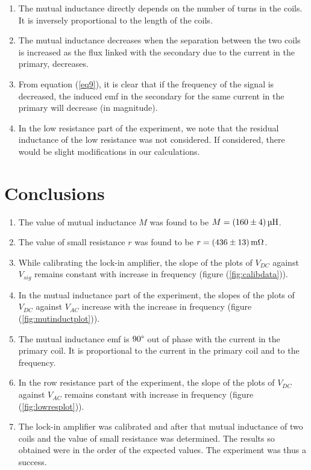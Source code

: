 \documentclass[%
 reprint,
nofootinbib,
 amsmath,amssymb,
 aps,
]{revtex4-2}
\begin{document}
\begin{enumerate}
    \item The mutual inductance directly depends on the number of turns in the coils. It is inversely proportional to the length of the coils.
    \item The mutual inductance decreases when the separation between the two coils is increased as the flux linked with the secondary due to the current in the primary, decreases.
    \item From equation (\ref{eq9}), it is clear that if the frequency of the signal is decreased, the induced emf in the secondary for the same current in the primary will decrease (in magnitude).
    \item In the low resistance part of the experiment, we note that the residual inductance of the low resistance was not considered. If considered, there would be slight modifications in our calculations.
\end{enumerate}

\section{Conclusions}
\begin{enumerate}
    \item The value of mutual inductance $M$ was found to be $M = \SI[separate-uncertainty=true]{160 \pm 4}{\micro \henry}$.
    \item The value of small resistance $r$ was found to be $r = \SI[separate-uncertainty=true]{436 \pm 13}{\milli \ohm}$.
    \item While calibrating the lock-in amplifier, the slope of the plots of $V_{DC}$ against $V_{sig}$ remains constant with increase in frequency (figure (\ref{fig:calibdata})).
    \item In the mutual inductance part of the experiment, the slopes of the plots of $V_{DC}$ against $V_{AC}$ increase with the increase in frequency (figure (\ref{fig:mutinductplot})).
    \item The mutual inductance emf is $90 \degree$ out of phase with the current in the primary coil. It is proportional to the current in the primary coil and to the frequency. 
    \item In the row resistance part of the experiment, the slope of the plots of $V_{DC}$ against $V_{AC}$ remains constant with increase in frequency (figure (\ref{fig:lowresplot})). 
    \item The lock-in amplifier was calibrated and after that mutual inductance of two coils and the value of small resistance was determined. The results so obtained were in the order of the expected values. The experiment was thus a success.
\end{enumerate}




\end{document}
